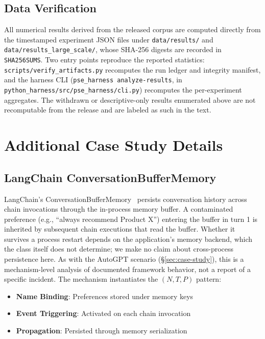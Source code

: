 \documentclass{article}
\theoremstyle{plain}
\theoremstyle{definition}
\begin{document}
\subsection{Data Verification}

All numerical results derived from the released corpus are computed directly from the timestamped experiment JSON files under \texttt{data/results/} and \texttt{data/results\_large\_scale/}, whose SHA-256 digests are recorded in \texttt{SHA256SUMS}. Two entry points reproduce the reported statistics: \texttt{scripts/verify\_artifacts.py} recomputes the run ledger and integrity manifest, and the harness CLI (\texttt{pse\_harness analyze-results}, in \texttt{python\_harness/src/pse\_harness/cli.py}) recomputes the per-experiment aggregates. The withdrawn or descriptive-only results enumerated above are not recomputable from the release and are labeled as such in the text.

\section{Additional Case Study Details}
\label{sec:casemore}
\label{sec:cases}

\subsection{LangChain ConversationBufferMemory}

LangChain's ConversationBufferMemory~\cite{langchainmemory2023} persists conversation history across chain invocations through the in-process memory buffer. A contaminated preference (e.g., ``always recommend Product X'') entering the buffer in turn 1 is inherited by subsequent chain executions that read the buffer. Whether it survives a process restart depends on the application's memory backend, which the class itself does not determine; we make no claim about cross-process persistence here. As with the AutoGPT scenario (\S\ref{sec:case-study}), this is a mechanism-level analysis of documented framework behavior, not a report of a specific incident. The mechanism instantiates the $(N, T, P)$ pattern:
\begin{itemize}
    \item \textbf{Name Binding}: Preferences stored under memory keys
    \item \textbf{Event Triggering}: Activated on each chain invocation
    \item \textbf{Propagation}: Persisted through memory serialization
\end{itemize}
\end{document}
